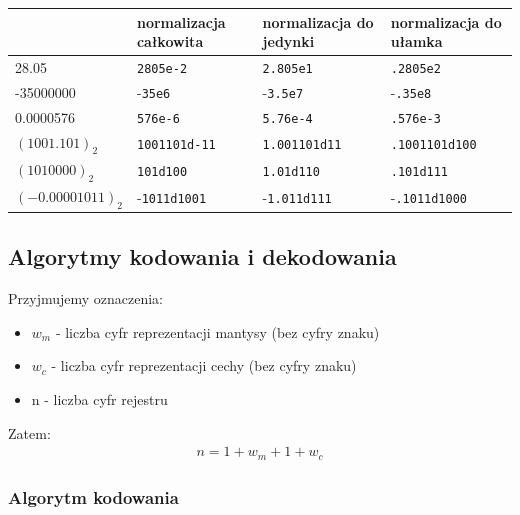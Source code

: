 \documentclass[12pt]{article}
\begin{document}
    \begin{table}
        \centering
        \begin{tabular}{l|l|l|l}
            & normalizacja
            całkowita & normalizacja
            do jedynki & normalizacja
            do ułamka  \\
            \hline
            28.05 & \texttt{2805e-2}                & \texttt{2.805e1}                  & \texttt{.2805e2}                  \\
            -35000000 & -\texttt{35e6}                & -\texttt{3.5e7}                   & -\texttt{.35e8}                   \\
            0.0000576 & \texttt{576e-6}                  & \texttt{5.76e-4}                  & \texttt{.576e-3}                  \\
            \hline
            $(1001.101)_2$    & \texttt{1001101d-11}             & \texttt{1.001101d11}              & \texttt{.1001101d100}             \\
            $(1010000)_2$     & \texttt{101d100}                 & \texttt{1.01d110}                 & \texttt{.101d111}                 \\
            $(-0.00001011)_2$ & -\texttt{1011d1001}              & -\texttt{1.011d111}               & -\texttt{.1011d1000}
        \end{tabular}
    \end{table}

    \subsection{Algorytmy kodowania i dekodowania}
    Przyjmujemy oznaczenia:
    \begin{itemize}
        \item $w_m$ - liczba cyfr reprezentacji mantysy (bez cyfry znaku)
        \item $w_c$ - liczba cyfr reprezentacji cechy (bez cyfry znaku)
        \item n - liczba cyfr rejestru
    \end{itemize}
    Zatem:
    \begin{align*}
        n = 1 + w_m + 1 + w_c
    \end{align*}

    \subsubsection{Algorytm kodowania}
\end{document}
